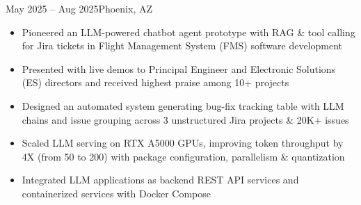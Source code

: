     {}
    {May 2025 -- Aug 2025}{Phoenix, AZ}{}
\begin{itemize}
    \item Pioneered an LLM-powered chatbot agent prototype with RAG \& tool calling
    for Jira tickets in Flight Management System (FMS) software development
    \item Presented with live demos to Principal Engineer and Electronic Solutions (ES) directors 
    and received highest praise among 10+ projects
    \item Designed an automated system generating bug-fix tracking table 
    with LLM chains and issue grouping across 3 unstructured Jira projects \& 20K+ issues

    \item Scaled LLM serving on RTX A5000 GPUs, improving token throughput by 4X (from 50 to 200) 
    with package configuration, parallelism \& quantization 
    \item Integrated LLM applications as backend REST API services and containerized services with Docker Compose
    
\end{itemize}
\dividerSmall


